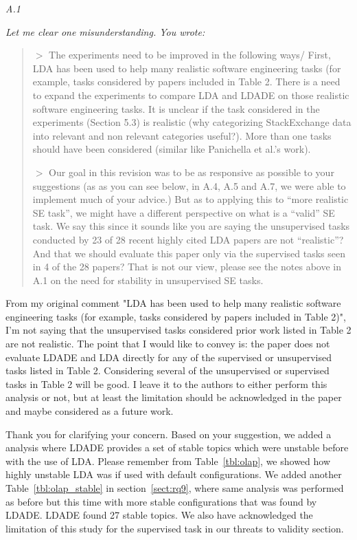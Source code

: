 \documentclass[twocolumn,5p,sort&compress]{elsarticle}
\theoremstyle{break}
\begin{document}
\textit{A.1\\}
{\em Let me clear one misunderstanding.
You wrote:
\begin{quote}

$>$ The experiments need to be improved in the following ways/ First, LDA has been used to help many realistic software engineering tasks (for example, tasks considered by papers included in Table 2. There is a need to expand the experiments to compare LDA and LDADE on those realistic software engineering tasks. It is unclear if the task considered in the experiments (Section 5.3) is realistic (why categorizing StackExchange data into relevant and non relevant categories useful?). More than one tasks should have been considered (similar like Panichella et al.’s work). 

$>$ Our goal in this revision was to be as responsive as possible to your suggestions (as as you can see below, in A.4, A.5 and A.7, we were able to implement much of your advice.) But as to applying this to “more realistic SE task”, we might have a different perspective on what is a “valid” SE task. 
We say this since it sounds like you are saying the unsupervised tasks conducted by 23 of 28 recent highly cited LDA papers are not “realistic”? And that we should evaluate this paper only via the supervised tasks seen in 4 of the 28 papers? That is not our view, please see the notes above in A.1 on the need for stability in unsupervised SE tasks.
\end{quote}

From my original comment "LDA has been used to help many realistic software engineering tasks (for example, tasks considered by papers included in Table 2)", I'm not saying that the unsupervised tasks considered prior work listed in Table 2 are not realistic. The point that I would like to convey is: the paper does not evaluate LDADE and LDA directly for any of the supervised or unsupervised tasks listed in Table 2. Considering several of the unsupervised or supervised tasks in Table 2 will be good.  I leave it to the authors to either perform this analysis or not, but at least the limitation should be acknowledged in the paper and maybe considered as  a future work.\\}

Thank you for clarifying your concern. Based on your suggestion, we added a analysis where LDADE provides a set of stable topics which were unstable before with the use of LDA. Please remember from Table~\ref{tbl:olap}, we showed how highly unstable LDA was if used with default configurations. We added another Table~\ref{tbl:olap_stable} in section~\ref{sect:rq9}, where same analysis was performed as before but this time with more stable configurations that was found by LDADE. LDADE found 27 stable topics. We also have acknowledged the limitation of this study for the supervised task in our threats to validity section.\\
\end{document}
